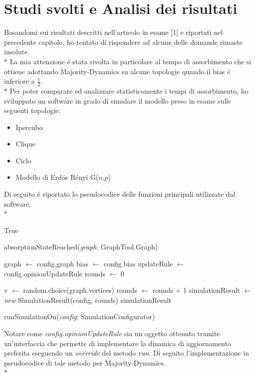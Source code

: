 \documentclass[../Tesi.tex]{subfiles}
\begin{document}
\chapter{Studi svolti e Analisi dei risultati}
Basandomi sui risultati descritti nell'articolo in esame [1] e riportati nel precedente capitolo, ho tentato di rispondere ad alcune delle domande rimaste insolute.\\*
La mia attenzione \'e stata rivolta in particolare al tempo di assorbimento che si ottiene adottando Majority-Dynamics su alcune topologie quando il bias \'e inferiore a $\frac{1}{2}$.\\*
Per poter comparare ed analizzare statisticamente i tempi di assorbimento, ho sviluppato un software in grado di simulare il modello preso in esame sulle seguenti topologie:
 \begin{itemize}
\item Ipercubo
\item Clique
\item Ciclo
\item Modello di Erd{\"o}s R\'enyi G($n$,$p$)
\end{itemize}
Di seguito \'e riportato lo pseudocodice delle funzioni principali utilizzate dal software.\\*

\begin{algorithm}[H]
  \Return True\;
\caption{absorptionStateReached(\emph{graph}: GraphTool.Graph)}
\end{algorithm}
 
 \hfill \break
 
\begin{algorithm}[H]
  graph $\gets$ config.graph\;
  bias $\gets$ config.bias\;
  updateRule $\gets$ config.opinionUpdateRule\;
  rounds $\gets$ 0\;

  {
    v $\gets$ random.choice(graph.vertices)\;
    rounds $\gets$ rounds + 1\;
  }
  simulationResult $\gets$ \emph{new} SimulationResult(config, rounds)\;
  \Return simulationResult\;
\caption{runSimulationOn(\emph{config}: SimulationConfigurator)}
\end{algorithm}
 
\hfill \break

Notare come \emph{config.opinionUpdateRule} sia un oggetto ottenuto tramite un'interfaccia che permette di implementare la dinamica di aggiornamento preferita eseguendo un \emph{override} del metodo \emph{run}. Di seguito l'implementazione in pseudocodice di tale metodo per Majority-Dynamics.\\*
\end{document}

